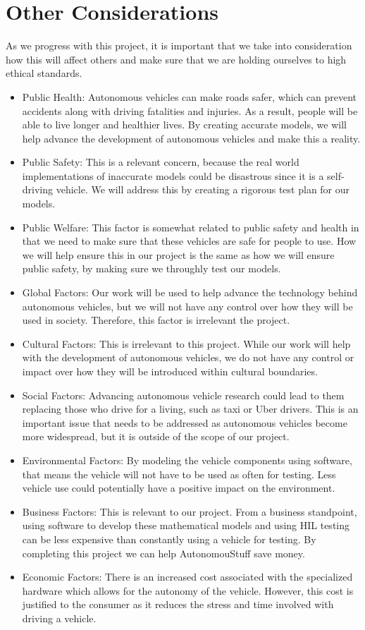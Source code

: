 \documentclass[12pt]{article} %
\begin{document}
\section{Other Considerations}
As we progress with this project, it is important that we take into consideration how this will affect others and make sure that we are holding ourselves to high ethical standards. 
\begin{itemize}
    \item Public Health: Autonomous vehicles can make roads safer, which can prevent accidents along with driving fatalities and injuries. As a result, people will be able to live longer and healthier lives. By creating accurate models, we will help advance the development of autonomous vehicles and make this a reality. 
    \item Public Safety: This is a relevant concern, because the real world implementations of inaccurate models could be disastrous since it is a self-driving vehicle. We will address this by creating a rigorous test plan for our models. 
    \item Public Welfare: This factor is somewhat related to public safety and health in that we need to make sure that these vehicles are safe for people to use. How we will help ensure this in our project is the same as how we will ensure public safety, by making sure we throughly test our models. 
    \item Global Factors: Our work will be used to help advance the technology behind autonomous vehicles, but we will not have any control over how they will be used in society. Therefore, this factor is irrelevant the project. 
    \item Cultural Factors: This is irrelevant to this project. While our work will help with the development of autonomous vehicles, we do not have any control or impact over how they will be introduced within cultural boundaries.
    \item Social Factors: Advancing autonomous vehicle research could lead to them replacing those who drive for a living, such as taxi or Uber drivers. This is an important issue that needs to be addressed as autonomous vehicles become more widespread, but it is outside of the scope of our project. 
    \item Environmental Factors: By modeling the vehicle components using software, that means the vehicle will not have to be used as often for testing. Less vehicle use could potentially have a positive impact on the environment. 
    \item Business Factors: This is relevant to our project. From a business standpoint, using software to develop these mathematical models and using HIL testing can be less expensive than constantly using a vehicle for testing. By completing this project we can help AutonomouStuff save money. 
    \item Economic Factors: There is an increased cost associated with the specialized hardware which allows for the autonomy of the vehicle. However, this cost is justified to the consumer as it reduces the stress and time involved with driving a vehicle. 
\end{itemize}

\pagebreak


\end{document}
